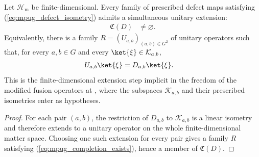 \begin{lemma}
    \label{thm:mpug_completion_class_nonempty}
    \leanok
    Let $\mathcal H_{\mathrm m}$ be finite-dimensional. Every family of
    prescribed defect maps satisfying (\ref{eq:mpug_defect_isometry}) admits a
    simultaneous unitary extension:
    \begin{align}
        \mathfrak C(D) & \neq\varnothing.
        \label{eq:mpug_completion_class_nonempty}
    \end{align}
    Equivalently, there is a family
    $R=(U_{a,b})_{(a,b)\in G^2}$ of unitary operators such that, for every
    $a,b\in G$ and every $\ket{\xi}\in\mathcal K_{a,b}$,
    \begin{align}
        U_{a,b}\ket{\xi}
         & =D_{a,b}\ket{\xi}.
        \label{eq:mpug_completion_exists}
    \end{align}
    This is the finite-dimensional extension step implicit in the freedom of
    the modified fusion operators at
    \cite[lines~4215--4326]{FrancoRubio2025MPUGauging}, where the subspaces
    $\mathcal K_{a,b}$ and their prescribed isometries enter as hypotheses.
\end{lemma}

\begin{proof}\leanok
    For each pair $(a,b)$, the restriction of $D_{a,b}$ to
    $\mathcal K_{a,b}$ is a linear isometry and therefore extends to a unitary
    operator on the whole finite-dimensional matter space. Choosing one such
    extension for every pair gives a family $R$ satisfying
    (\ref{eq:mpug_completion_exists}), hence a member of $\mathfrak C(D)$.
\end{proof}

